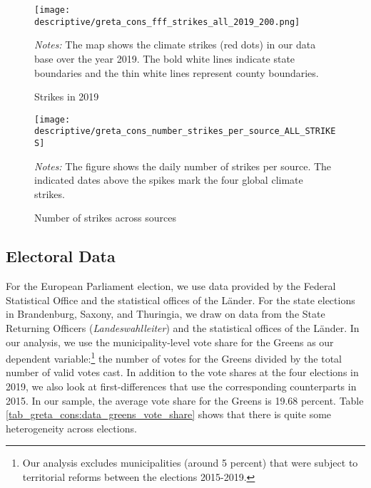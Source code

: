 \begin{figure}[t]\centering
	\caption{Strikes in 2019}\label{fig_greta_cons:fff_strikes_2019}
	\texttt{[image: descriptive/greta\_cons\_fff\_strikes\_all\_2019\_200.png]}
	\begin{minipage}{0.8\linewidth}
		\scriptsize{\emph{Notes:} The map shows the climate strikes (red dots) in our data base over the year 2019. The bold white lines indicate state boundaries and the thin white lines represent county boundaries.}
	\end{minipage}
\end{figure}


\begin{figure}[t]\centering
	\caption{Number of strikes across sources}\label{fig_greta_cons:number_strikes_per_source}
	\texttt{[image: descriptive/greta\_cons\_number\_strikes\_per\_source\_ALL\_STRIKES]}
	\begin{minipage}{0.8\linewidth}
		\scriptsize{\emph{Notes:} The figure shows the daily number of strikes per source. The indicated dates above the spikes mark the four global climate strikes.}
	\end{minipage}
\end{figure}






\subsection{Electoral Data}
For the European Parliament election, we use data provided by the Federal Statistical Office and the statistical offices of the Länder. For the state elections in Brandenburg, Saxony, and Thuringia, we draw on data from the State Returning Officers (\textit{Landeswahlleiter}) and the statistical offices of the Länder. In our analysis, we use the municipality-level vote share for the Greens as our dependent variable:\footnote{Our analysis excludes municipalities (around 5 percent) that were subject to territorial reforms between the elections 2015-2019.} the number of votes for the Greens divided by the total number of valid votes cast. In addition to the vote shares at the four elections in 2019, we also look at first-differences that use the corresponding counterparts in 2015. In our sample, the average vote share for the Greens is 19.68 percent. Table \ref{tab_greta_cons:data_greens_vote_share} shows that there is quite some heterogeneity across elections.




